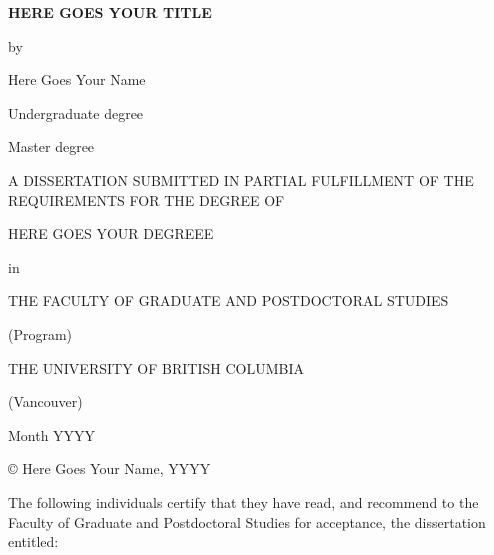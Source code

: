 \documentclass[
]{article}
\author{}
\date{\vspace{-2.5em}}
\begin{document}
\thispagestyle{empty}
\begin{singlespace} 
\begin{center}

\Huge

\textbf{HERE GOES YOUR TITLE}

\Large

\vspace{8mm}

by

\vspace{8mm}

\huge

Here Goes Your Name

\Large

\vspace{8mm}

Undergraduate degree

Master degree

\vspace{10mm}

A DISSERTATION SUBMITTED IN PARTIAL FULFILLMENT OF THE REQUIREMENTS FOR THE DEGREE OF

\vspace{5mm}

HERE GOES YOUR DEGREEE

\vspace{5mm}
in

\vspace{5mm}

THE FACULTY OF GRADUATE AND POSTDOCTORAL STUDIES

\vspace{5mm}

(Program)

\vspace{5mm}

THE UNIVERSITY OF BRITISH COLUMBIA

\vspace{5mm}

(Vancouver)

\vspace{6mm}

Month YYYY

© Here Goes Your Name, YYYY

\end{center}
\end{singlespace}
\normalsize
\clearpage

\setcounter{page}{2}

\doublespacing

The following individuals certify that they have read, and recommend to the Faculty of Graduate
and Postdoctoral Studies for acceptance, the dissertation entitled:
\end{document}
